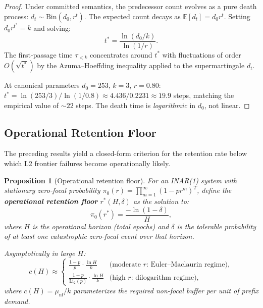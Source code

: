 \documentclass[11pt]{article}
\theoremstyle{plain}
\newtheorem{proposition}[theorem]{Proposition}
\theoremstyle{definition}
\theoremstyle{remark}
\begin{document}
\begin{proof}
Under committed semantics, the predecessor count evolves as a pure
death process: $d_t \sim \mathrm{Bin}(d_0, r^t)$.  The expected count
decays as $\mathbb{E}[d_t] = d_0 r^t$.  Setting
$d_0 r^{t^*} = k$ and solving:
\[
  t^* = \frac{\ln(d_0/k)}{\ln(1/r)}.
\]
The first-passage time $\tau_{<k}$ concentrates around $t^*$ with
fluctuations of order $O(\sqrt{t^*})$ by the Azuma--Hoeffding
inequality applied to the supermartingale $d_t$.

At canonical parameters $d_0 = 253$, $k = 3$, $r = 0.80$:
$t^* = \ln(253/3)/\ln(1/0.8) \approx 4.436/0.2231 \approx 19.9$
steps, matching the empirical value of ${\sim}22$ steps.  The death
time is \emph{logarithmic} in $d_0$, not linear.
\end{proof}

\subsection{Operational Retention Floor}

The preceding results yield a closed-form criterion for the retention
rate below which L2 frontier failures become operationally likely.

\begin{proposition}[Operational retention floor]\label{prop:retention-floor}
For an INAR(1) system with stationary zero-focal probability
$\pi_0(r) = \prod_{m=1}^{\infty}(1 - pr^m)^T$, define the
\textbf{operational retention floor} $r^*(H, \delta)$ as the solution
to:
\begin{equation}\label{eq:retention-floor}
  \pi_0(r^*) = \frac{-\ln(1-\delta)}{H},
\end{equation}
where $H$ is the operational horizon (total epochs) and $\delta$ is
the tolerable probability of at least one catastrophic zero-focal
event over that horizon.

Asymptotically in large $H$:
\begin{equation}\label{eq:retention-asymp}
  c(H) \approx
  \begin{cases}
    \displaystyle \frac{1-p}{p} \cdot \frac{\ln H}{k}
    & \text{(moderate $r$: Euler--Maclaurin regime)},\\[8pt]
    \displaystyle \frac{1-p}{\mathrm{Li}_2(p)} \cdot \frac{\ln H}{k}
    & \text{(high $r$: dilogarithm regime)},
  \end{cases}
\end{equation}
where $c(H) = \mu_{\mathrm{nf}}/k$ parameterizes the required non-focal
buffer per unit of prefix demand.
\end{proposition}
\end{document}
